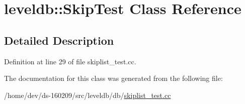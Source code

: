 \hypertarget{classleveldb_1_1_skip_test}{}\section{leveldb\+:\+:Skip\+Test Class Reference}
\label{classleveldb_1_1_skip_test}


\subsection{Detailed Description}


Definition at line 29 of file skiplist\+\_\+test.\+cc.



The documentation for this class was generated from the following file\+:\begin{DoxyCompactItemize}
\item 
/home/dev/ds-\/160209/src/leveldb/db/\hyperlink{skiplist__test_8cc}{skiplist\+\_\+test.\+cc}\end{DoxyCompactItemize}
